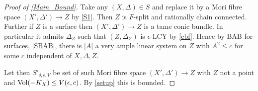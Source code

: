 \begin{proof}[Proof of \autoref{Main_Bound}]
	Take any $(X,\Delta)\in S$ and replace it by a Mori fibre space $(X',\Delta') \to Z$ by \autoref{S1}. Then $Z$ is $F$-split and rationally chain connected. Further if $Z$ is a surface then $(X',\Delta')\to Z$ is a tame conic bundle. In particular it admits $\Delta_{Z}$ such that $(Z,\Delta_{Z})$ is $\epsilon$-LCY by \autoref{cbf}. Hence by BAB for surfaces, \autoref{SBAB}, there is $|A|$ a very ample linear system on $Z$ with $A^{2}\leq c$ for some $c$ independent of $X,\Delta,Z$. 
	
	Let then $S'_{\delta,\epsilon,V}$ be set of such Mori fibre space $(X',\Delta') \to Z$ with $Z$ not a point and $\text{Vol}(-K_{X})\leq V(\epsilon,c)$. By \autoref{setup} this is bounded.	

	\end{proof}



%
%
%	
	
%